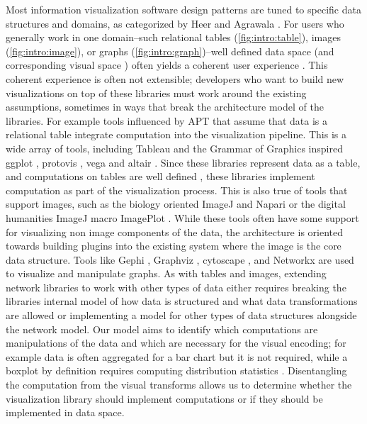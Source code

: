 \documentclass[../main.tex]{subfiles}
\begin{document}
Most information visualization software design patterns are tuned to specific data structures and domains, as categorized by Heer and Agrawala  \cite{HeerSoftware2006}. For users who generally work in one domain--such relational tables (\autoref{fig:intro:table}), images (\autoref{fig:intro:image}), or graphs (\autoref{fig:intro:graph})--well defined data space (and corresponding visual space  \cite{chiTaxonomyVisualizationTechniques2000}) often yields a coherent user experience \cite{heerDeclarative2010}. This coherent experience is often not extensible; developers who want to build new visualizations on top of these libraries must work around the existing assumptions, sometimes in ways that break the architecture model of the libraries. For example tools influenced by APT that assume that data is a relational table integrate computation into the visualization pipeline. This is a wide array of tools, including Tableau \cite{StoltePolaris2002,hanrahanVizQL2006,MackinlayShowme2007} and the Grammar of Graphics \cite{wilkinsonGrammarGraphics2005} inspired ggplot \cite{wickhamGgplot2ElegantGraphics2016a}, protovis \cite{bostockProtoviz2009}, vega \cite{satyanarayanDeclarativeInteractionDesign2014} and altair \cite{vanderplasAltairInteractiveStatistical2018}. Since these libraries represent data as a table, and computations on tables are well defined \cite{ullmanFirstCourseDatabase2008}, these libraries implement computation as part of the visualization process. This is also true of tools that support images, such as the biology oriented ImageJ \cite{schneiderNIHImageImageJ2012} and  Napari \cite{nicholas_sofroniew_2021_4533308} or the digital humanities ImageJ macro ImagePlot \cite{studiesCulturevisImageplot2021}. While these tools often have some support for visualizing non image components of the data, the architecture is oriented towards building plugins into the existing system \cite{WritingPlugins} where the image is the core data structure. Tools like Gephi \cite{bastianGephiOpenSource2009}, Graphviz \cite{ellsonGraphvizOpenSource2002}, cytoscape \cite{shannonCytoscapeSoftwareEnvironment2003}, and Networkx \cite{HagbergExploringNetwork2008} are used to  visualize and manipulate graphs. As with tables and images, extending network libraries to work with other types of data either requires breaking the libraries internal model of how data is structured and what data transformations are allowed or implementing a model for other types of data structures alongside the network model. Our model aims to identify which computations are manipulations of the data and which are necessary for the visual encoding; for example data is often aggregated for a bar chart but it is not required, while a boxplot by definition requires computing distribution statistics \cite{wickham40YearsBoxplots2011}. Disentangling the computation from the visual transforms allows us to determine whether the visualization library should implement computations or if they should be implemented in data space. 
\end{document}
